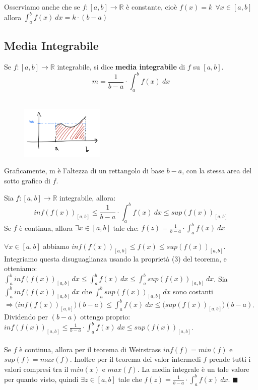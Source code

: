 \begin{observation}
Osserviamo anche che se $f: [a,b] \to \mathbb{R}$ è constante, cioè $f(x) = k \:\: \forall x \in [a,b]$ allora $\int_a^b f(x) \:dx = k \cdot (b-a)$
\end{observation}

\subsection{Media Integrabile}
\begin{definition}
Se $f: [a,b] \to \mathbb{R}$ integrabile, si dice \textbf{media integrabile} di $f$ su $[a,b]$.
\vspace{-10pt}
\[m = \frac{1}{b-a} \cdot \int_a^b f(x) \:dx\]\\
\end{definition}
\begin{figure}
\vspace{-45pt}
    \centering
    \includegraphics[width=4cm]{images/media-integrabile.png}
\end{figure}
\vspace{-10pt}
Graficamente, m è l'altezza di un rettangolo di base $b-a$, con la stessa area del sotto grafico di $f$.
\vspace{15pt}
\begin{theorem}
Sia $f:[a,b] \to \mathbb{R}$ integrabile, allora:
\vspace{-5pt}
\[inf(f(x))_{[a,b]} \leq \frac{1}{b-a} \cdot \int_a^b f(x) \:dx \leq sup(f(x))_{[a,b]}\]
Se $f$ è continua, allora $\exists x \in [a,b]$ tale che:
$f(z) = \frac{1}{b-a} \cdot \int_a^b f(x) \:dx$
\end{theorem}

\begin{demostration}
$\forall x \in [a,b]$ abbiamo $inf(f(x))_{[a,b]} \leq f(x) \leq sup(f(x))_{[a,b]}$. Integriamo questa disuguaglianza usando la proprietà (3) del teorema, e otteniamo:\\
$\int_a^b inf(f(x))_{[a,b]}\:dx \leq \int_a^b f(x)\:dx \leq \int_a^b sup(f(x))_{[a,b]}\:dx$. Sia $\int_a^b inf(f(x))_{[a,b]}\:dx$ che $\int_a^b sup(f(x))_{[a,b]}\:dx$ sono costanti $\Longrightarrow \big( inf(f(x))_{[a,b]} \big)(b-a) \leq \int_a^b f(x)\:dx \leq \big( sup(f(x))_{[a,b]} \big)(b-a)$.\\
Dividendo per $(b-a)$ ottengo proprio: $inf(f(x))_{[a,b]} \leq \frac{1}{b-a} \cdot \int_a^b f(x) \:dx \leq sup(f(x))_{[a,b]}$.\\\\
Se $f$ è continua, allora per il teorema di Weirstrass $inf(f) = min(f)$ e $sup(f) = max(f)$. Inoltre per il teorema dei valor intermedi $f$ prende tutti i valori compresi tra il $min(x)$ e $max(f)$. La media integrale è un tale valore per quanto visto, quindi $\exists z \in [a,b]$ tale che $f(z) = \frac{1}{b-a} \cdot \int_a^b f(x)\:dx$. $\blacksquare$
\end{demostration}

